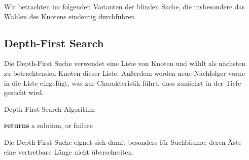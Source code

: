 Wir betrachten im folgenden Varianten der blinden Suche, die insbesondere das Wählen des Knotens eindeutig durchführen.

\subsection{Depth-First Search}
\bigskip
Die Depth-First Suche verwendet eine Liste von Knoten und wählt als nächsten zu betrachtenden Knoten dieser Liste. Außerdem werden neue Nachfolger vorne in die Liste eingefügt, was zur Charakteristik führt, dass zunächst in der Tiefe gesucht wird. \\


\begin{algorithm}
\caption{Depth-First Search Algorithm}
\begin{algorithmic}[1]
 \State \textbf{returns} a solution, or failure
\EndFunction
\EndFunction
\end{algorithmic}
\end{algorithm}

Die Depth-First Suche eignet sich damit besonders für Suchbäume, deren Äste eine vertretbare Länge nicht überschreiten.\\

